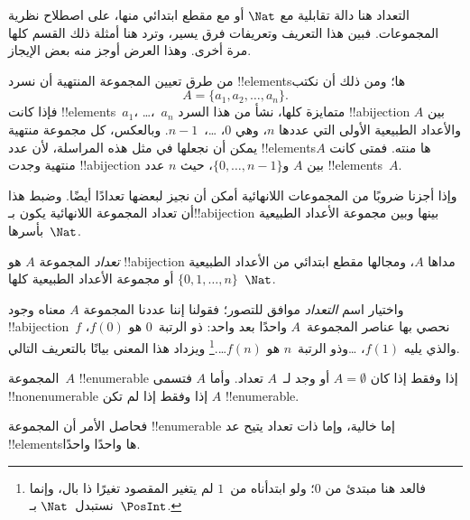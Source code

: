 \documentclass[../../../include/open-logic-section]{subfiles}
\begin{document}


\begin{editorial}
التعداد هنا دالة تقابلية مع $\Nat$ أو مع مقطع ابتدائي منها، على اصطلاح نظرية المجموعات. فبين هذا التعريف وتعريفات  فرق يسير، وترد هنا أمثلة ذلك القسم كلها مرة أخرى. وهذا العرض أوجز منه بعض الإيجاز.
\end{editorial}

من طرق تعيين المجموعة المنتهية أن نسرد !!{element}sها؛ ومن ذلك أن نكتب
\[
  A = \{a_1, a_2, \ldots, a_n\}.
\]
فإذا كانت !!{element}s~$a_1$، \dots،~$a_n$ متمايزة كلها، نشأ من هذا السرد !!a{bijection} بين $A$ والأعداد الطبيعية الأولى التي عددها $n$، وهي $0$، \dots،~$n-1$. وبالعكس، كل مجموعة منتهية يمكن أن نجعلها في مثل هذه المراسلة، لأن عدد !!{element}sها منته. فمتى كانت $A$ منتهية وجدت !!a{bijection} بين $A$ و$\{0, \dots, n-1\}$، حيث $n$ عدد !!{element}s~$A$.

وإذا أجزنا ضروبًا من المجموعات اللانهائية أمكن أن نجيز لبعضها تعدادًا أيضًا. وضبط هذا أن تعداد المجموعة اللانهائية يكون بـ!!a{bijection} بينها وبين مجموعة الأعداد الطبيعية بأسرها~$\Nat$.

\begin{defn}
\emph{تعداد} المجموعة $A$ هو !!a{bijection} مداها $A$، ومجالها مقطع ابتدائي من الأعداد الطبيعية $\{0, 1, \ldots, n\}$ {أو} مجموعة الأعداد الطبيعية كلها~$\Nat$.
\end{defn}

\begin{explain}
واختيار اسم \emph{التعداد} موافق للتصور؛ فقولنا إننا عددنا المجموعة $A$ معناه وجود !!a{bijection}~$f$ نحصي بها عناصر المجموعة~$A$ واحدًا بعد واحد: ذو الرتبة~$0$ هو $f(0)$، والذي يليه $f(1)$، \ldots وذو الرتبة~$n$ هو $f(n)$\ldots.\footnote{فالعد هنا مبتدئ من $0$؛ ولو ابتدأناه من~$1$ لم يتغير المقصود تغيرًا ذا بال، وإنما نستبدل~$\Nat$ بـ~$\PosInt$.} ويزداد هذا المعنى بيانًا بالتعريف التالي.
\end{explain}

\begin{defn}
المجموعة~$A$ !!{enumerable} إذا وفقط إذا كان $A = \emptyset$ أو وجد لـ~$A$ تعداد. وأما $A$ فتسمى !!{nonenumerable} إذا وفقط إذا لم تكن $A$ !!{enumerable}.
\end{defn}

\begin{explain}
فحاصل الأمر أن المجموعة !!{enumerable} إما خالية، وإما ذات تعداد يتيح عد !!{element}sها واحدًا واحدًا.
\end{explain}
\end{document}
